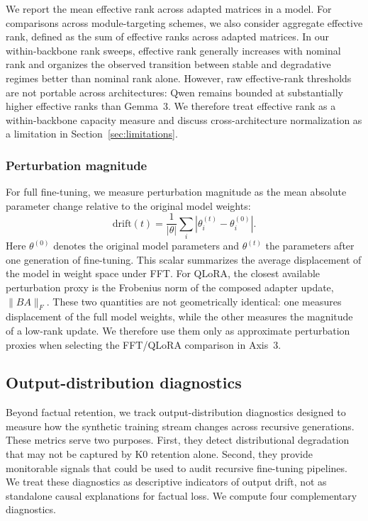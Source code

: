 \documentclass[a4paper,fleqn]{cas-dc}
\begin{document}
We report the mean effective rank across adapted
matrices in a model. For comparisons across module-targeting schemes, we also
consider aggregate effective rank, defined as the sum of effective ranks across
adapted matrices. In our within-backbone rank sweeps, effective rank generally
increases with nominal rank and organizes the observed transition between
stable and degradative regimes better than nominal rank alone. However,
raw effective-rank thresholds are not portable across architectures: Qwen
remains bounded at substantially higher effective ranks than Gemma~3. We
therefore treat effective rank as a within-backbone capacity measure and discuss
cross-architecture normalization as a limitation in Section~\ref{sec:limitations}.

\subsubsection{Perturbation magnitude}\label{sec:pertmag}
For full fine-tuning, we measure perturbation magnitude as the mean absolute
parameter change relative to the original model weights:
\begin{equation}\label{eq:drift}
    \mathrm{drift}(t) =
    \frac{1}{|\theta|}\sum_i |\theta^{(t)}_i - \theta^{(0)}_i|.
\end{equation}
Here $\theta^{(0)}$ denotes the original model parameters and $\theta^{(t)}$
the parameters after one generation of fine-tuning. This scalar summarizes the
average displacement of the model in weight space under FFT. For QLoRA, the
closest available perturbation proxy is the Frobenius norm of the composed
adapter update, $\|BA\|_F$. These two quantities are not geometrically identical:
one measures displacement of the full model weights, while the other measures
the magnitude of a low-rank update. We therefore use them only as approximate
perturbation proxies when selecting the FFT/QLoRA comparison in Axis~3.

\subsection{Output-distribution diagnostics}\label{sec:metrics}

Beyond factual retention, we track output-distribution diagnostics designed to
measure how the synthetic training stream changes across recursive generations.
These metrics serve two purposes. First, they detect distributional degradation
that may not be captured by K0 retention alone. Second, they provide monitorable
signals that could be used to audit recursive fine-tuning pipelines. We treat
these diagnostics as descriptive indicators of output drift, not as standalone
causal explanations for factual loss. We compute four complementary diagnostics.
\end{document}
